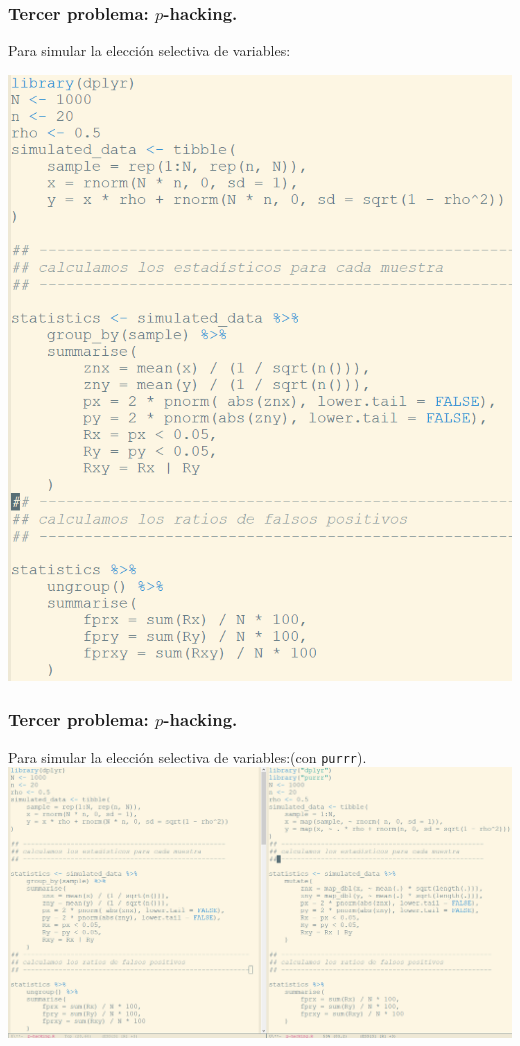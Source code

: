 \documentclass[9pt]{beamer}
\begin{document}
\begin{frame}
  \frametitle{Tercer problema: $p$-hacking.}
  Para simular la elección selectiva de variables:\\
  \begin{center}
    \includegraphics[height=0.9\textheight]{images/R-script-1}
  \end{center}
\end{frame}

\begin{frame}
  \frametitle{Tercer problema: $p$-hacking.}
  \begin{overlayarea}{\textwidth}{\textheight}
  Para simular la elección selectiva de variables:\alert{(con
    {\tt purrr})}.\\
  \hspace*{-1cm}
  \includegraphics[width=1.2\textwidth]{images/R-script-1_sinoptico}
\end{overlayarea}
\end{frame}
\end{document}
